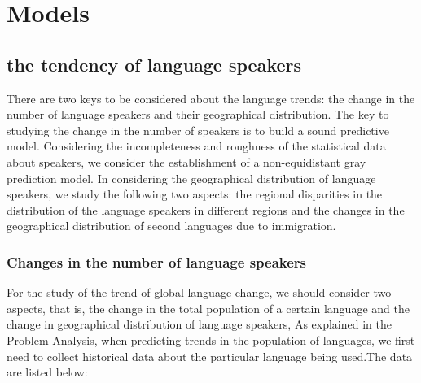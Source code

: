 \section{Models}

\subsection{the tendency of language speakers}
\noindent There are two keys to be considered about the language trends: the change in the number of language speakers and their geographical distribution. The key to studying the change in the number of speakers is to build a sound predictive model. Considering the incompleteness and roughness of the statistical data about speakers, we consider the establishment of a non-equidistant gray prediction model. In considering the geographical distribution of language speakers, we study the following two aspects: the regional disparities in the distribution of the language speakers in different regions and the changes in the geographical distribution of second languages due to immigration.

\subsubsection{Changes in the number of language speakers}
\noindent For the study of the trend of global language change, we should consider two aspects, that is, the change in the total population of a certain language and the change in geographical distribution of language speakers, As explained in the Problem Analysis, when predicting trends in the population of languages, we first need to collect historical data about the particular language being used.The data are listed below:


